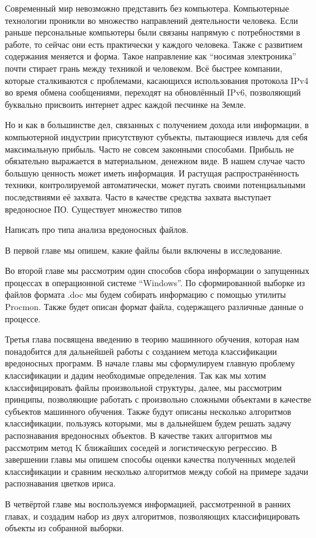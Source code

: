 
Современный мир невозможно представить без компьютера. Компьютерные технологии проникли во множество направлений деятельности человека. Если раньше персональные компьютеры были связаны напрямую с потребностями в работе, то сейчас они есть практически у каждого человека. Также с развитием содержания меняется и форма. Такое направление как “носимая электроника” почти стирает грань между техникой и человеком. Всё быстрее компании, которые сталкиваются с проблемами, касающихся использования протокола IPv4 во время обмена сообщениями, переходят на обновлённый IPv6, позволяющий буквально присвоить интернет адрес каждой песчинке на Земле.

Но и как в большинстве дел, связанных с получением дохода или информации, в компьютерной индустрии присутствуют субъекты, пытающиеся извлечь для себя максимальную прибыль. Часто не совсем законными способами. Прибыль не обязательно выражается в материальном, денежном виде. В нашем случае часто большую ценность может иметь информация. И растущая распространённость техники, контролируемой автоматически, может пугать своими потенциальными последствиями её захвата. Часто в качестве средства захвата выступает вредоносное ПО. Существует 
множество типов

Написать про типа анализа вредоносных файлов.

В первой главе мы опишем, какие файлы были включены в исследование.

Во второй главе мы рассмотрим один способов сбора информации о запущенных процессах в операционной системе “Windows”.  По сформированной выборке из файлов формата .doc мы будем собирать информацию с помощью утилиты Procmon. Также будет описан формат файла, содержащего различные данные о процессе.

Третья глава посвящена введению в теорию машинного обучения, которая нам понадобится для дальнейшей работы с созданием метода классификации вредоносных программ. В начале главы мы сформулируем главную проблему классификации и дадим необходимые определения. Так как мы хотим классифицировать файлы произвольной структуры, далее, мы рассмотрим принципы, позволяющие работать с произвольно сложными объектами в качестве субъектов машинного обучения. Также будут описаны несколько алгоритмов классификации, пользуясь которыми, мы в дальнейшем будем решать задачу распознавания вредоносных объектов. В качестве таких алгоритмов мы рассмотрим метод K ближайших соседей и логистическую регрессию.  В завершении главы мы опишем способы оценки качества полученных моделей классификации и сравним несколько алгоритмов между собой на примере задачи распознавания цветков ириса.

В четвёртой главе мы воспользуемся информацией, рассмотренной в ранних главах, и создадим набор из двух алгоритмов, позволяющих классифицировать объекты из собранной выборки.


